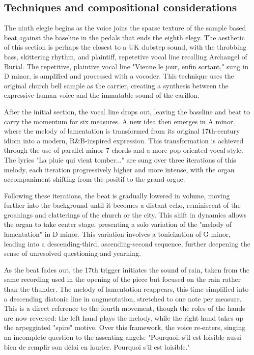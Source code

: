 \documentclass[12pt,twoside,maitrise]{dms_ks}
\theoremstyle{definition}
\begin{document}
\subsection{Techniques and compositional considerations}

The ninth elegie begins as the voice joins the sparse texture of the sample based beat against the baseline in the pedals that ends the eighth elegy. 
The aesthetic of this section is perhaps the closest to a UK dubstep sound, with the throbbing bass, skittering rhythm, and plaintiff, repetetive vocal line recalling Archangel of Burial. 
The repetitive, plaintive vocal line "Vienne le jour, enfin sortant," sung in D minor, is amplified and processed with a vocoder. 
This technique uses the original church bell sample as the carrier, creating a synthesis between the expressive human voice and the immutable sound of the carillon.


After the initial section, the vocal line drops out, leaving the bassline and beat to carry the momentum for six measures. 
A new idea then emerges in A minor, where the melody of lamentation is transformed from its original 17th-century idiom into a modern, R\&B-inspired expression. 
This transformation is achieved through the use of parallel minor 7 chords and a more pop oriented vocal style. 
The lyrics "La pluie qui vient tomber..." are sung over three iterations of this melody, each iteration progressively higher and more intense, with the organ accompaniment shifting from the positif to the grand orgue.

Following these iterations, the beat is gradually lowered in volume, moving further into the background until it becomes a distant echo, reminiscent of the groanings and clatterings of the church or the city. 
This shift in dynamics allows the organ to take center stage, presenting a solo variation of the "melody of lamentation" in D minor. 
This variation involves a tonicization of G minor, leading into a descending-third, ascending-second sequence, further deepening the sense of unresolved questioning and yearning.


As the beat fades out, the 17th trigger initiates the sound of rain, taken from the same recording used in the opening of the piece but focused on the rain rather than the thunder. 
The melody of lamentation reappears, this time simplified into a descending diatonic line in augmentation, stretched to one note per measure. 
This is a direct reference to the fourth movement, though the roles of the hands are now reversed: the left hand plays the melody, while the right hand takes up the arpeggiated "spire" motive. 
Over this framework, the voice re-enters, singing an incomplete question to the assenting angels: "Pourquoi, s'il est loisible aussi bien de remplir son délai en laurier. 
Pourquoi s'il est loisible."
\end{document}
